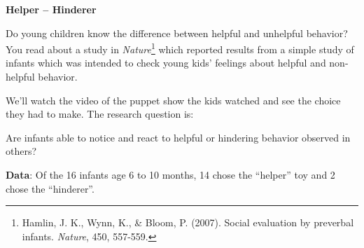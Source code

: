
\def\theTopic{Helper--Hinderer }
\def\dayNum{4}


\begin{center}
\vspace*{-.2in}
{\bf {\large Helper -- Hinderer}}\\
\end{center}

Do young children know the difference between helpful and unhelpful
behavior?  You read about a study in   {\it Nature}\footnote{ Hamlin, J. K.,
  Wynn, K., \& Bloom, P. (2007). Social evaluation by preverbal
  infants. {\it Nature}, 450, 557-559. } which
reported results from a simple study of infants which was intended to
check young kids' feelings about helpful and non-helpful behavior.  

We'll watch the video of the puppet show the kids watched and see the
choice they had to make.  The research question is:
\begin{center}
  {\sf Are infants able to notice and react to helpful or hindering
    behavior observed in others?} 
\end{center}

{\bf Data}:  Of the 16 infants age 6 to 10 months, 14 chose the ``helper'' toy
and 2 chose the ``hinderer''.

